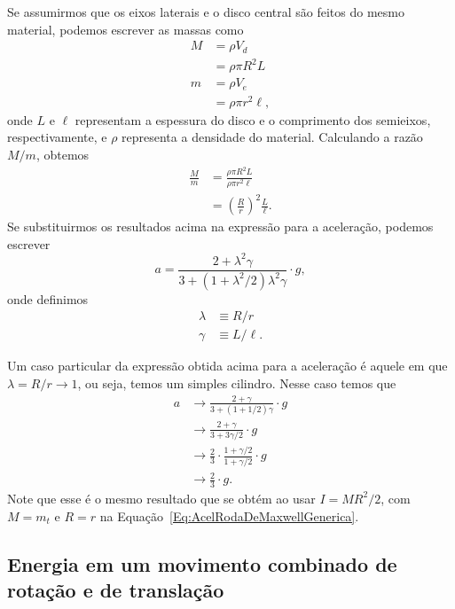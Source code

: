 Se assumirmos que os eixos laterais e o disco central são feitos do mesmo material, podemos escrever as massas como
\begin{align}
    M &= \rho V_d \\
    &= \rho \pi R^2 L \\
    m &= \rho V_e \\
    &= \rho \pi r^2 \ell,
\end{align}
%
onde $L$ e $\ell$ representam a espessura do disco e o comprimento dos semieixos, respectivamente, e $\rho$ representa a densidade do material. Calculando a razão $M/m$, obtemos
\begin{align}
    \frac{M}{m} &= \frac{\rho \pi R^2 L}{\rho \pi r^2 \ell} \\
    &= \left(\frac{R}{r}\right)^2\frac{L}{\ell}.
\end{align}
%
Se substituirmos os resultados acima na expressão para a aceleração, podemos escrever
\begin{equation}
    a = \frac{2 + \lambda^2\gamma}{3 + (1 + \lambda^2/2) \lambda^2 \gamma} \cdot g,
\end{equation}
%
onde definimos
\begin{align}
    \lambda &\equiv R/r \\
    \gamma &\equiv L/\ell.
\end{align}

Um caso particular da expressão obtida acima para a aceleração é aquele em que $\lambda = R/r \to 1$, ou seja, temos um simples cilindro. Nesse caso temos que
\begin{align}
    a &\to \frac{2 + \gamma}{3 + (1 + 1/2)\gamma} \cdot g \\
    &\to \frac{2 + \gamma}{3 + 3\gamma/2} \cdot g \\
    &\to \frac{2}{3} \cdot \frac{ 1 + \gamma/2}{1 + \gamma/2} \cdot g \\
    &\to \frac{2}{3} \cdot g.
\end{align}
%
Note que esse é o mesmo resultado que se obtém ao usar $I = MR^2 / 2$, com $M = m_t$ e $R = r$ na Equação~\eqref{Eq:AcelRodaDeMaxwellGenerica}.

\subsection{Energia em um movimento combinado de rotação e de translação}
\label{Sec:EnergiaMovCombRotTrans}

